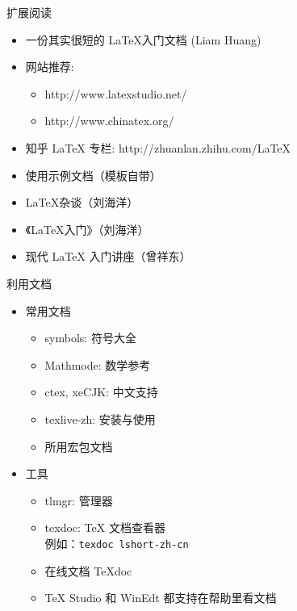 \begin{frame}{扩展阅读}
  \begin{itemize}
    \item 一份其实很短的 \LaTeX 入门文档 (Liam Huang) 
    \item 网站推荐:
      \begin{itemize}
        \item http://www.latexstudio.net/
        \item http://www.chinatex.org/
      \end{itemize}
    \item 知乎 LaTeX 专栏: http://zhuanlan.zhihu.com/LaTeX
    \item \ThuThesis{}使用示例文档（模板自带）
    \item \LaTeX{}杂谈（刘海洋）
    \item 《\LaTeX{}入门》（刘海洋）
    \item 现代 LaTeX 入门讲座（曾祥东）
  \end{itemize}
\end{frame}


\begin{frame}{利用文档}
  \begin{itemize}
    \item 常用文档
      \begin{itemize}
        \item symbols: 符号大全
        \item Mathmode: 数学参考
        \item ctex, xeCJK: 中文支持
        \item texlive-zh: \TL 安装与使用
        \item 所用宏包文档
      \end{itemize}
    \item 工具
      \begin{itemize}
        \item tlmgr: \TL 管理器
        \item texdoc: \TeX{} 文档查看器\\
          例如：\texttt{texdoc lshort-zh-cn}
        \item 在线文档 \TeX{}doc 
        \item TeX Studio 和 WinEdt 都支持在帮助里看文档
      \end{itemize}
  \end{itemize}
\end{frame}

